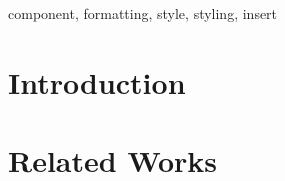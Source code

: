 \documentclass[conference]{IEEEtran}
\begin{document}
\begin{abstract}
%
%
%
\end{abstract}

\begin{IEEEkeywords}
component, formatting, style, styling, insert
\end{IEEEkeywords}

\section{Introduction}


\section{Related Works}

\end{document}

